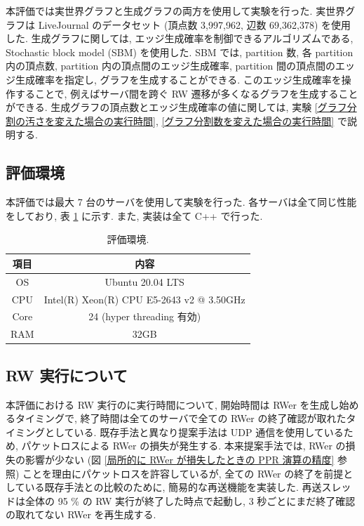 本評価では実世界グラフと生成グラフの両方を使用して実験を行った. 実世界グラフは LiveJournal のデータセット\cite{snapnets} (頂点数 3,997,962, 辺数 69,362,378) を使用した. 生成グラフに関しては, エッジ生成確率を制御できるアルゴリズムである, Stochastic block model (SBM) \cite{SBM} を使用した. SBM では, partition 数, 各 partition 内の頂点数, partition 内の頂点間のエッジ生成確率, partition 間の頂点間のエッジ生成確率を指定し, グラフを生成することができる. このエッジ生成確率を操作することで, 例えばサーバ間を跨ぐ RW 遷移が多くなるグラフを生成することができる. 生成グラフの頂点数とエッジ生成確率の値に関しては, 実験 \ref{グラフ分割の汚さを変えた場合の実行時間}, \ref{グラフ分割数を変えた場合の実行時間} で説明する. 

\subsection{評価環境}

本評価では最大 7 台のサーバを使用して実験を行った. 各サーバは全て同じ性能をしており, 表 \ref{評価環境} に示す. また, 実装は全て C++ で行った. 

\begin{table}[t]
    \caption{評価環境.}
    \label{評価環境}
    \centering
    \begin{tabular}{c|c}
      \hline
      項目 & 内容   \\
      \hline \hline
      OS  & Ubuntu 20.04 LTS \\
      CPU  & Intel(R) Xeon(R) CPU E5-2643 v2 @ 3.50GHz  \\
      Core & 24 (hyper threading 有効) \\
      RAM  & 32GB \\
      \hline
    \end{tabular}
\end{table}

\subsection{RW 実行について}

本評価における RW 実行のに実行時間について, 開始時間は RWer を生成し始めるタイミングで, 終了時間は全てのサーバで全ての RWer の終了確認が取れたタイミングとしている. 既存手法と異なり提案手法は UDP 通信を使用しているため, パケットロスによる RWer の損失が発生する. 本来提案手法では, RWer の損失の影響が少ない (図 \ref{局所的に RWer が損失したときの PPR 演算の精度} 参照) ことを理由にパケットロスを許容しているが, 全ての RWer の終了を前提としている既存手法との比較のために, 簡易的な再送機能を実装した. 再送スレッドは全体の 95 \% の RW 実行が終了した時点で起動し, 3 秒ごとにまだ終了確認の取れてない RWer を再生成する.  

